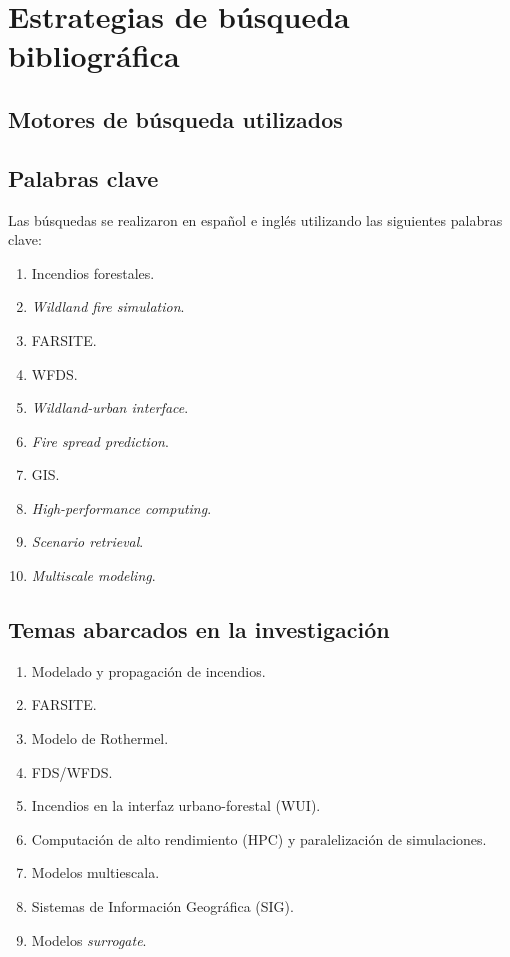 \clearpage
\section{Estrategias de búsqueda bibliográfica}

\subsection{Motores de búsqueda utilizados}

\subsection{Palabras clave}

Las búsquedas se realizaron en español e inglés utilizando las siguientes palabras clave:

\begin{enumerate}
    \item Incendios forestales.
    \item \textit{Wildland fire simulation}.
    \item FARSITE.
    \item WFDS.
    \item \textit{Wildland-urban interface}.
    \item \textit{Fire spread prediction}.
    \item GIS.
    \item \textit{High-performance computing}.
    \item \textit{Scenario retrieval}.
    \item \textit{Multiscale modeling}.
\end{enumerate}

\subsection{Temas abarcados en la investigación}

\begin{enumerate}
    \item Modelado y propagación de incendios.
    \item FARSITE.
    \item Modelo de Rothermel.
    \item FDS/WFDS.
    \item Incendios en la interfaz urbano-forestal (WUI).
    \item Computación de alto rendimiento (HPC) y paralelización de simulaciones.
    \item Modelos multiescala.
    \item Sistemas de Información Geográfica (SIG).
    \item Modelos \textit{surrogate}.
\end{enumerate}
